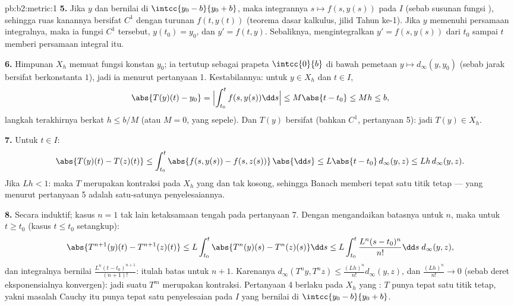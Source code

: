 \begin{solution}{pb:b2:metric:1}
\textbf{5.} Jika $y$  dan bernilai di $\intcc{y_0 -
b}{y_0 + b}$, maka integrannya $s \mapsto f(s, y(s))$ 
pada $I$ (sebab susunan fungsi ), sehingga ruas kanannya bersifat
$C^1$ dengan turunan $f(t, y(t))$ (teorema dasar kalkulus, jilid Tahun
ke-1). Jika $y$ memenuhi persamaan integralnya, maka ia fungsi
$C^1$ tersebut, $y(t_0) = y_0$, dan $y' = f(t, y)$. Sebaliknya,
mengintegralkan $y' = f(s, y(s))$ dari $t_0$ sampai $t$ memberi
persamaan integral itu.

\textbf{6.} Himpunan $X_h$ memuat fungsi konstan $y_0$; ia tertutup
sebagai prapeta $\intcc{0}{b}$ di bawah pemetaan  $y
\mapsto d_\infty(y, y_0)$ (sebab jarak bersifat  berkonstanta
$1$), jadi ia  menurut pertanyaan 1. Kestabilannya: untuk $y \in
X_h$ dan $t \in I$,
\[
\abs{T(y)(t) - y_0} = \Bigl|\int_{t_0}^{t}f(s, y(s))\dd s\Bigr|
\leq M\abs{t - t_0} \leq Mh \leq b ,
\]
langkah terakhirnya berkat $h \leq b/M$ (atau $M = 0$, yang sepele). Dan
$T(y)$ bersifat  (bahkan $C^1$, pertanyaan 5): jadi $T(y) \in X_h$.

\textbf{7.} Untuk $t \in I$:
\[
\abs{T(y)(t) - T(z)(t)} \leq \int_{t_0}^{t}\abs{f(s, y(s)) -
f(s, z(s))}\,\abs{\dd s} \leq L\abs{t - t_0}\,d_\infty(y,z)
\leq Lh\,d_\infty(y,z).
\]
Jika $Lh < 1$: maka $T$ merupakan kontraksi pada $X_h$ yang  dan
tak kosong, sehingga Banach memberi tepat satu titik tetap --- yang
menurut pertanyaan 5 adalah satu-satunya penyelesaiannya.

\textbf{8.} Secara induktif; kasus $n = 1$ tak lain ketaksamaan tengah
pada pertanyaan 7. Dengan mengandaikan batasnya untuk $n$, maka untuk $t
\geq t_0$ (kasus $t \leq t_0$ setangkup):
\[
\abs{T^{n+1}(y)(t) - T^{n+1}(z)(t)}
\leq L\int_{t_0}^{t}\abs{T^n(y)(s) - T^n(z)(s)}\dd s
\leq L\int_{t_0}^{t}\frac{L^n(s - t_0)^n}{n!}\dd s\;
d_\infty(y,z),
\]
dan integralnya bernilai $\frac{L^n(t -
t_0)^{n+1}}{(n+1)!}$: itulah batas untuk $n + 1$. Karenanya
$d_\infty(T^n y, T^n z) \leq \frac{(Lh)^n}{n!}d_\infty(y, z)$,
dan $\frac{(Lh)^n}{n!} \to 0$ (sebab deret eksponensialnya
konvergen): jadi suatu $T^m$ merupakan kontraksi. Pertanyaan 4 berlaku
pada $X_h$ yang : $T$ punya tepat satu titik tetap, yakni
masalah Cauchy itu punya tepat satu penyelesaian pada $I$ yang bernilai
di $\intcc{y_0 - b}{y_0 + b}$.


\end{solution}
